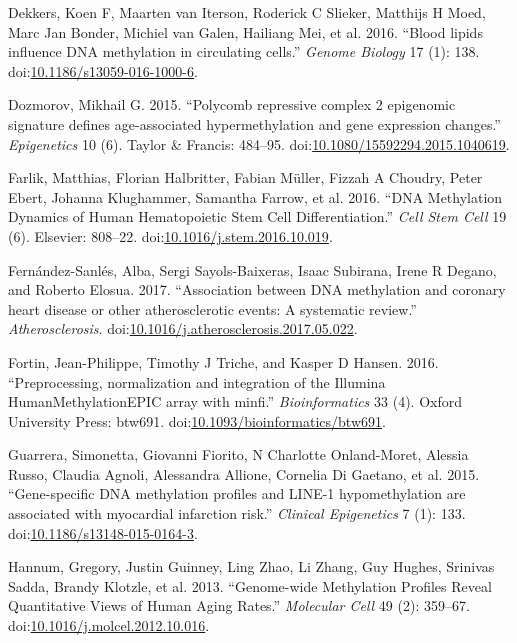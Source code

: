 \documentclass[]{article}
\theoremstyle{definition}
\theoremstyle{definition}
\theoremstyle{definition}
\theoremstyle{remark}
\begin{document}
Dekkers, Koen F, Maarten van Iterson, Roderick C Slieker, Matthijs H
Moed, Marc Jan Bonder, Michiel van Galen, Hailiang Mei, et al. 2016.
``Blood lipids influence DNA methylation in circulating cells.''
\emph{Genome Biology} 17 (1): 138.
doi:\href{http://dx.doi.org/10.1186/s13059-016-1000-6}{10.1186/s13059-016-1000-6}.

Dozmorov, Mikhail G. 2015. ``Polycomb repressive complex 2 epigenomic
signature defines age-associated hypermethylation and gene expression
changes.'' \emph{Epigenetics} 10 (6). Taylor \& Francis: 484--95.
doi:\href{http://dx.doi.org/10.1080/15592294.2015.1040619}{10.1080/15592294.2015.1040619}.

Farlik, Matthias, Florian Halbritter, Fabian M{ü}ller, Fizzah A Choudry,
Peter Ebert, Johanna Klughammer, Samantha Farrow, et al. 2016. ``DNA
Methylation Dynamics of Human Hematopoietic Stem Cell Differentiation.''
\emph{Cell Stem Cell} 19 (6). Elsevier: 808--22.
doi:\href{http://dx.doi.org/10.1016/j.stem.2016.10.019}{10.1016/j.stem.2016.10.019}.

Fern{á}ndez-Sanl{é}s, Alba, Sergi Sayols-Baixeras, Isaac Subirana, Irene
R Degano, and Roberto Elosua. 2017. ``Association between DNA
methylation and coronary heart disease or other atherosclerotic events:
A systematic review.'' \emph{Atherosclerosis}.
doi:\href{http://dx.doi.org/10.1016/j.atherosclerosis.2017.05.022}{10.1016/j.atherosclerosis.2017.05.022}.

Fortin, Jean-Philippe, Timothy J Triche, and Kasper D Hansen. 2016.
``Preprocessing, normalization and integration of the Illumina
HumanMethylationEPIC array with minfi.'' \emph{Bioinformatics} 33 (4).
Oxford University Press: btw691.
doi:\href{http://dx.doi.org/10.1093/bioinformatics/btw691}{10.1093/bioinformatics/btw691}.

Guarrera, Simonetta, Giovanni Fiorito, N Charlotte Onland-Moret, Alessia
Russo, Claudia Agnoli, Alessandra Allione, Cornelia {Di Gaetano}, et al.
2015. ``Gene-specific DNA methylation profiles and LINE-1
hypomethylation are associated with myocardial infarction risk.''
\emph{Clinical Epigenetics} 7 (1): 133.
doi:\href{http://dx.doi.org/10.1186/s13148-015-0164-3}{10.1186/s13148-015-0164-3}.

Hannum, Gregory, Justin Guinney, Ling Zhao, Li Zhang, Guy Hughes,
Srinivas Sadda, Brandy Klotzle, et al. 2013. ``Genome-wide Methylation
Profiles Reveal Quantitative Views of Human Aging Rates.''
\emph{Molecular Cell} 49 (2): 359--67.
doi:\href{http://dx.doi.org/10.1016/j.molcel.2012.10.016}{10.1016/j.molcel.2012.10.016}.
\end{document}
